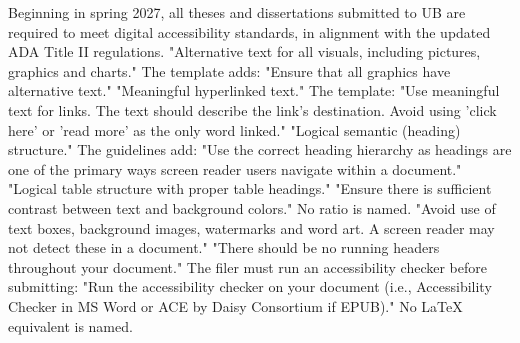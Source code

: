 
%
\thesisrequiretagging
{}
	{Beginning in spring 2027, all theses and dissertations submitted to UB are
	 required to meet digital accessibility standards, in alignment with the
	 updated ADA Title II regulations.}
	{"Alternative text for all visuals, including pictures, graphics and
	 charts." The template adds: "Ensure that all graphics have alternative
	 text."}
	{"Meaningful hyperlinked text." The template: "Use meaningful text for
	 links. The text should describe the link's destination. Avoid using 'click
	 here' or 'read more' as the only word linked."}
	{"Logical semantic (heading) structure." The guidelines add: "Use the
	 correct heading hierarchy as headings are one of the primary ways screen
	 reader users navigate within a document."}
	{"Logical table structure with proper table headings."}
	{"Ensure there is sufficient contrast between text and background colors."
	 No ratio is named.}
	{"Avoid use of text boxes, background images, watermarks and word art. A
	 screen reader may not detect these in a document."}
	{"There should be no running headers throughout your document."}
	{The filer must run an accessibility checker before submitting: "Run the
	 accessibility checker on your document (i.e., Accessibility Checker in MS
	 Word or ACE by Daisy Consortium if EPUB)." No LaTeX equivalent is named.}

